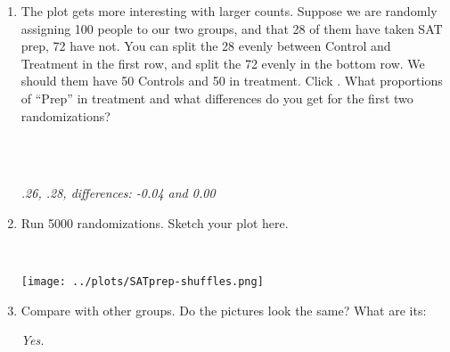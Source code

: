 \begin{enumerate}
\begin{enumerate}
\item The plot gets more interesting with larger counts. Suppose 
      we are randomly assigning 100 people to our two groups, and that
      28 of them have taken SAT prep, 72 have not. You can split the 28 evenly
      between Control and Treatment in the first row, and split the 72
      evenly in the bottom row. We should them have 50  Controls and
      50 in treatment. Click . 
      What proportions of ``Prep'' in treatment and what differences
      do you get for the first two randomizations? 
\begin{students}
        \vspace{1cm}\\
\end{students}
\begin{key}
  \\ {\it .26, .28, differences: -0.04 and 0.00}
\end{key}
       \item Run 5000 randomizations.  Sketch your plot here.
\begin{students}
        \vspace{4cm}\\
\end{students}
\begin{key}
  
   \texttt{[image: ../plots/SATprep-shuffles.png]}
\end{key}
     \item Compare with other groups.  Do the pictures look the
       same? What are its:
\begin{key}
  {\it  Yes. }
\end{key}



\end{enumerate}
\end{enumerate}
